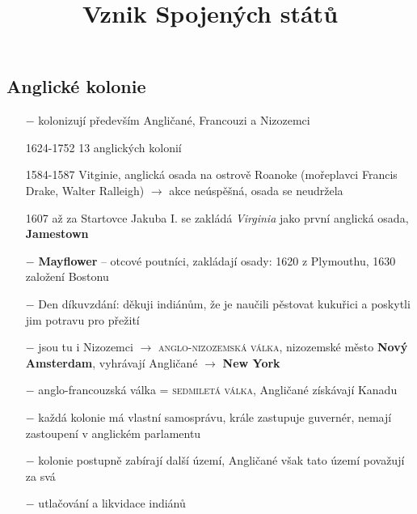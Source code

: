 \documentclass{article}
\title{\vspace{-2cm}Vznik Spojených států\vspace{-1.7cm}}
\date{}
\author{}
\begin{document}
\maketitle

\subsection*{Anglické kolonie}
\begin{itemize}
    \vspace{-0.5em}
    \setlength\itemsep{0.15em}
    \item[$-$] kolonizují především Angličané, Francouzi a Nizozemci
    \item[1624-1752] 13 anglických kolonií
    \item[1584-1587] Vitginie, anglická osada na ostrově Roanoke (mořeplavci Francis Drake, Walter Ralleigh) $\rightarrow$ akce neúspěšná, osada se neudržela
    \item[1607] až za Startovce Jakuba I. se zakládá \textit{Virginia} jako první anglická osada, \textbf{Jamestown}
    \item[$-$] \textbf{Mayflower} -- otcové poutníci, zakládají osady: 1620 z Plymouthu, 1630 založení Bostonu
    \item[$-$] Den díkuvzdání: děkuji indiánům, že je naučili pěstovat kukuřici a poskytli jim potravu pro přežití
    \item[$-$] jsou tu i Nizozemci $\rightarrow$ \textsc{anglo-nizozemská válka}, nizozemské město \textbf{Nový Amsterdam}, vyhrávají Angličané $\rightarrow$ \textbf{New York}
    \item[$-$] anglo-francouzská válka = \textsc{sedmiletá válka}, Angličané získávají Kanadu
    \item[$-$] každá kolonie má vlastní samosprávu, krále zastupuje guvernér, nemají zastoupení v anglickém parlamentu
    \item[$-$] kolonie postupně zabírají další území, Angličané však tato území považují za svá
    \item[$-$] utlačování a likvidace indiánů
\end{itemize}
\end{document}
